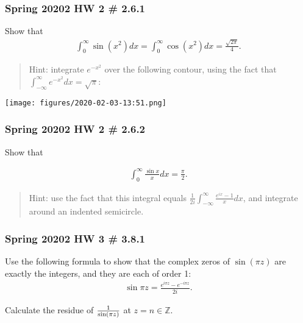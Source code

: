 \hypertarget{spring-20202-hw-2-2.6.1}{%
\subsubsection{Spring 20202 HW 2 \#
2.6.1}\label{spring-20202-hw-2-2.6.1}}

Show that
\begin{align*}
\int_{0}^{\infty} \sin \left(x^{2}\right) d x=\int_{0}^{\infty} \cos \left(x^{2}\right) d x=\frac{\sqrt{2 \pi}}{4}
.\end{align*}

\begin{quote}
Hint: integrate \(e^{-x^2}\) over the following contour, using the fact
that \(\int_{-\infty}^{\infty} e^{-x^{2}} d x=\sqrt{\pi}\):
\end{quote}

\texttt{[image: figures/2020-02-03-13:51.png]}\\

\hypertarget{spring-20202-hw-2-2.6.2}{%
\subsubsection{Spring 20202 HW 2 \#
2.6.2}\label{spring-20202-hw-2-2.6.2}}

Show that

\begin{align*}
\int_{0}^{\infty} \frac{\sin x}{x} d x=\frac{\pi}{2}
.\end{align*}

\begin{quote}
Hint: use the fact that this integral equals
\(\frac{1}{2 i} \int_{-\infty}^{\infty} \frac{e^{i x}-1}{x} d x\), and
integrate around an indented semicircle.
\end{quote}

\hypertarget{spring-20202-hw-3-3.8.1}{%
\subsubsection{Spring 20202 HW 3 \#
3.8.1}\label{spring-20202-hw-3-3.8.1}}

Use the following formula to show that the complex zeros of
\(\sin(\pi z)\) are exactly the integers, and they are each of order 1:
\begin{align*}
\sin \pi z=\frac{e^{i \pi z}-e^{-i \pi z}}{2 i}
.\end{align*}

Calculate the residue of \({1\over \sin(\pi z)}\) at
\(z=n\in {\mathbb{Z}}\).

